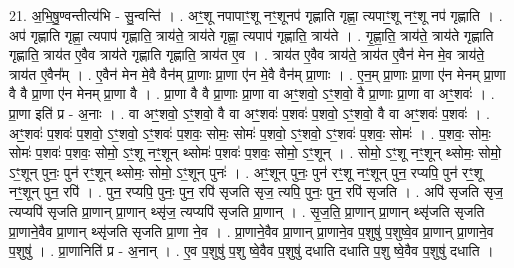\documentclass[17pt]{extarticle}
\begin{document}
21. अ॒भि॒षु॒ण्वन्तीत्य॑भि - सु॒न्वन्ति॑ । . अꣳ॒॒शू नपापाꣳ॒॒शू नꣳ॒॒शूनप॑ गृह्णाति गृह्णा॒ त्यपाꣳ॒॒शू नꣳ॒॒शू नप॑ गृह्णाति । . अप॑ गृह्णाति गृह्णा॒ त्यपाप॑ गृह्णाति॒ त्राय॑ते॒ त्राय॑ते गृह्णा॒ त्यपाप॑ गृह्णाति॒ त्राय॑ते । . गृ॒ह्णा॒ति॒ त्राय॑ते॒ त्राय॑ते गृह्णाति गृह्णाति॒ त्राय॑त ए॒वैव त्राय॑ते गृह्णाति गृह्णाति॒ त्राय॑त ए॒व । . त्राय॑त ए॒वैव त्राय॑ते॒ त्राय॑त ए॒वैन॑ मेन मे॒व त्राय॑ते॒ त्राय॑त ए॒वैन᳚म् । . ए॒वैन॑ मेन मे॒वै वैन॑म् प्रा॒णाः प्रा॒णा ए॑न मे॒वै वैन॑म् प्रा॒णाः । . ए॒न॒म् प्रा॒णाः प्रा॒णा ए॑न मेनम् प्रा॒णा वै वै प्रा॒णा ए॑न मेनम् प्रा॒णा वै । . प्रा॒णा वै वै प्रा॒णाः प्रा॒णा वा अꣳ॒॒शवो॒ ऽꣳ॒शवो॒ वै प्रा॒णाः प्रा॒णा वा अꣳ॒॒शवः॑ । . प्रा॒णा इति॑ प्र - अ॒नाः । . वा अꣳ॒॒शवो॒ ऽꣳ॒शवो॒ वै वा अꣳ॒॒शवः॑ प॒शवः॑ प॒शवो॒ ऽꣳ॒शवो॒ वै वा 
अꣳ॒॒शवः॑ प॒शवः॑ । . अꣳ॒॒शवः॑ प॒शवः॑ प॒शवो॒ ऽꣳ॒शवो॒ ऽꣳ॒शवः॑ प॒शवः॒ सोमः॒ सोमः॑ 
प॒शवो॒ ऽꣳ॒शवो॒ ऽꣳ॒शवः॑ प॒शवः॒ सोमः॑ । . प॒शवः॒ सोमः॒ सोमः॑ प॒शवः॑ प॒शवः॒ सोमो॒ ऽꣳ॒शू नꣳ॒॒शून् थ्सोमः॑ प॒शवः॑ प॒शवः॒ सोमो॒ ऽꣳ॒शून् । . सोमो॒ ऽꣳ॒शू नꣳ॒॒शून् थ्सोमः॒ सोमो॒ ऽꣳ॒शून् पुनः॒ पुन॑ रꣳ॒॒शून् थ्सोमः॒ सोमो॒ ऽꣳ॒शून् पुनः॑ । . अꣳ॒॒शून् पुनः॒ पुन॑ रꣳ॒॒शू नꣳ॒॒शून् पुन॒ रप्यपि॒ पुन॑ रꣳ॒॒शू नꣳ॒॒शून् पुन॒ रपि॑ । . पुन॒ रप्यपि॒ पुनः॒ पुन॒ रपि॑ सृजति सृज॒ त्यपि॒ पुनः॒ पुन॒ रपि॑ सृजति । . अपि॑ सृजति सृज॒ त्यप्यपि॑ सृजति प्रा॒णान् प्रा॒णान् थ्सृ॑ज॒ त्यप्यपि॑ सृजति प्रा॒णान् । . सृ॒ज॒ति॒ प्रा॒णान् प्रा॒णान् थ्सृ॑जति सृजति प्रा॒णाने॒वैव प्रा॒णान् थ्सृ॑जति सृजति प्रा॒णा ने॒व । . प्रा॒णाने॒वैव प्रा॒णान् प्रा॒णाने॒व प॒शुषु॑ प॒शुष्वे॒व प्रा॒णान् प्रा॒णाने॒व प॒शुषु॑ । . प्रा॒णानिति॑ प्र - अ॒नान् । . ए॒व प॒शुषु॑ प॒शु ष्वे॒वैव प॒शुषु॑ दधाति दधाति प॒शु ष्वे॒वैव प॒शुषु॑ दधाति । \newline
\end{document}
